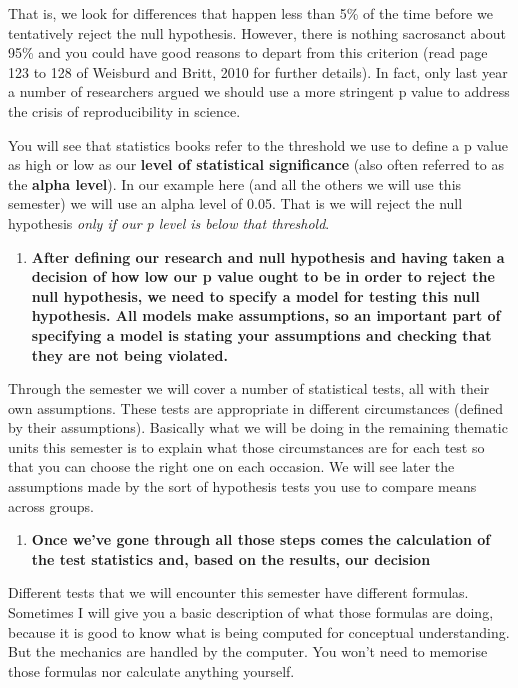 \documentclass[
]{book}
\providecommand{\tightlist}{%
  \setlength{\itemsep}{0pt}\setlength{\parskip}{0pt}}
\begin{document}
That is, we look for differences that happen less than 5\% of the time before we tentatively reject the null hypothesis. However, there is nothing sacrosanct about 95\% and you could have good reasons to depart from this criterion (read page 123 to 128 of Weisburd and Britt, 2010 for further details). In fact, only last year a number of researchers argued we should use a more stringent p value to address the crisis of reproducibility in science.

You will see that statistics books refer to the threshold we use to define a p value as high or low as our \textbf{level of statistical significance} (also often referred to as the \textbf{alpha level}). In our example here (and all the others we will use this semester) we will use an alpha level of 0.05. That is we will reject the null hypothesis \emph{only if our p level is below that threshold}.

\begin{enumerate}
\def\labelenumi{\arabic{enumi}.}
\setcounter{enumi}{4}
\tightlist
\item
  \textbf{After defining our research and null hypothesis and having taken a decision of how low our p value ought to be in order to reject the null hypothesis, we need to specify a model for testing this null hypothesis. All models make assumptions, so an important part of specifying a model is stating your assumptions and checking that they are not being violated. }
\end{enumerate}

Through the semester we will cover a number of statistical tests, all with their own assumptions. These tests are appropriate in different circumstances (defined by their assumptions). Basically what we will be doing in the remaining thematic units this semester is to explain what those circumstances are for each test so that you can choose the right one on each occasion. We will see later the assumptions made by the sort of hypothesis tests you use to compare means across groups.

\begin{enumerate}
\def\labelenumi{\arabic{enumi}.}
\setcounter{enumi}{5}
\tightlist
\item
  \textbf{Once we've gone through all those steps comes the calculation of the test statistics and, based on the results, our decision}
\end{enumerate}

Different tests that we will encounter this semester have different formulas. Sometimes I will give you a basic description of what those formulas are doing, because it is good to know what is being computed for conceptual understanding. But the mechanics are handled by the computer. You won't need to memorise those formulas nor calculate anything yourself.
\end{document}
